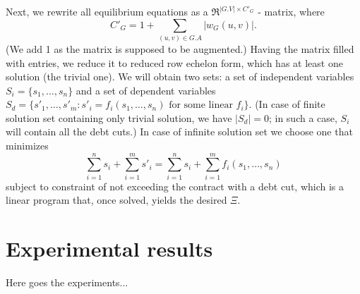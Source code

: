 \documentclass[10pt]{article}
\newcommand{\RR}{\mathfrak{R}}
\begin{document}
Next, we rewrite all equilibrium equations as a $\RR^{|G.V| \times C'_G}$ - matrix, where 
\[
C'_G = 1 + \sum_{(u, v) \in G.A} |w_G(u, v)|.
\]
(We add 1 as the matrix is supposed to be augmented.) Having the matrix filled with entries, we reduce it to reduced row echelon form, which has at least one solution (the trivial one).
We will obtain two sets: a set of independent variables $S_i = \{ s_1, \dots, s_n \}$ and a set of dependent variables $S_d = \{ s'_1, \dots, s'_m \colon s'_i = f_i(s_1, \dots, s_n) \text{ for some linear } f_i \}$. (In case of finite solution set containing only trivial solution, we have $|S_d| = 0$; in such a case, $S_i$ will contain all the debt cuts.) In case of infinite solution set we choose one that minimizes
\[
\sum_{i = 1}^{n} s_i + \sum_{i = 1}^{m} s'_i = \sum_{i = 1}^{n} s_i + \sum_{i = 1}^{m} f_i(s_1, \dots, s_n) 
\]
subject to constraint of not exceeding the contract with a debt cut, which is a linear program that, once solved, yields the desired $\Xi$.

\section{Experimental results}
Here goes the experiments...
\end{document}
